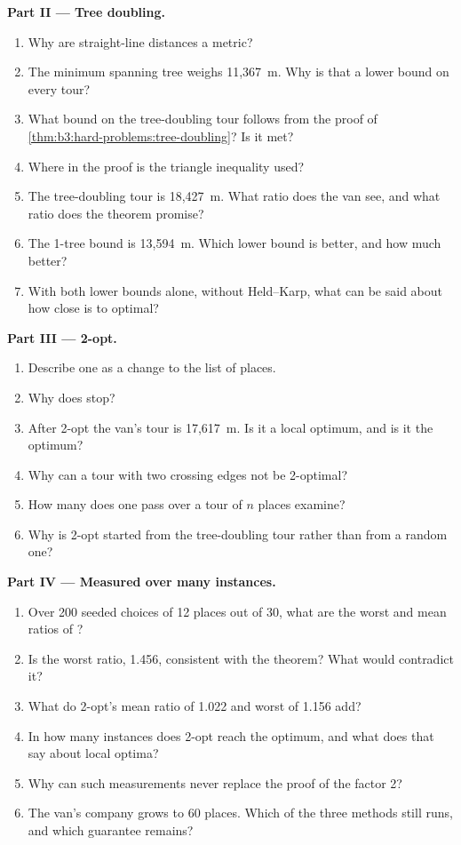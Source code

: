 \begin{problem}
\medskip\noindent\textbf{Part II --- Tree doubling.}
\begin{enumerate}[resume]
  \item Why are straight-line distances a metric?
  \item The minimum spanning tree weighs 11,367~m. Why is that a lower bound on every tour?
  \item What bound on the tree-doubling tour follows from the proof of \cref{thm:b3:hard-problems:tree-doubling}? Is it met?
  \item Where in the proof is the triangle inequality used?
  \item The tree-doubling tour is 18,427~m. What ratio does the van see, and what ratio does the theorem promise?
  \item The 1-tree bound is 13,594~m. Which lower bound is better, and how much better?
  \item With both lower bounds alone, without Held--Karp, what can be said about how close  is to optimal?
\end{enumerate}

\medskip\noindent\textbf{Part III --- 2-opt.}
\begin{enumerate}[resume]
  \item Describe one  as a change to the list of places.
  \item Why does  stop?
  \item After 2-opt the van's tour is 17,617~m. Is it a local optimum, and is it the optimum?
  \item Why can a tour with two crossing edges not be 2-optimal?
  \item How many  does one pass over a tour of $n$ places examine?
  \item Why is 2-opt started from the tree-doubling tour rather than from a random one?
\end{enumerate}

\medskip\noindent\textbf{Part IV --- Measured over many instances.}
\begin{enumerate}[resume]
  \item Over 200 seeded choices of 12 places out of 30, what are the worst and mean ratios of ?
  \item Is the worst ratio, 1.456, consistent with the theorem? What would contradict it?
  \item What do 2-opt's mean ratio of 1.022 and worst of 1.156 add?
  \item In how many instances does 2-opt reach the optimum, and what does that say about local optima?
  \item Why can such measurements never replace the proof of the factor 2?
  \item The van's company grows to 60 places. Which of the three methods still runs, and which guarantee remains?
\end{enumerate}
\end{problem}

